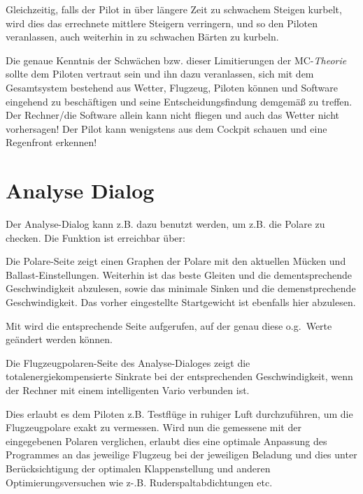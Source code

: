 Gleichzeitig,  falls der Pilot in über längere Zeit zu schwachem Steigen kurbelt,
wird dies das errechnete mittlere Steigern verringern, und so den Piloten veranlassen, auch
weiterhin in zu schwachen Bärten zu kurbeln.


\textsf{\textcolor[rgb]{0.00,0.00,0.50}
{Die genaue Kenntnis der Schwächen bzw. dieser Limitierungen
der MC-\textsl{Theorie} sollte  dem Piloten vertraut sein und ihn dazu veranlassen, sich mit dem
Gesamtsystem bestehend aus Wetter, Flugzeug, Piloten können und Software eingehend zu beschäftigen
und seine Entscheidungsfindung demgemäß zu treffen. Der Rechner/die Software allein kann nicht fliegen
und auch das Wetter nicht vorhersagen! Der Pilot kann wenigstens aus dem Cockpit schauen und eine
Regenfront erkennen!}}

\section{Analyse Dialog}

Der Analyse-Dialog kann z.B. dazu benutzt werden, um z.B. die Polare zu checken.
Die Funktion ist erreichbar über:

Die Polare-Seite zeigt einen  Graphen der Polare mit den aktuellen Mücken und Ballast-Einstellungen.
Weiterhin ist das beste Gleiten und die dementsprechende Geschwindigkeit abzulesen, sowie das
minimale Sinken und die demenstprechende Geschwindigkeit.
Das vorher eingestellte  Startgewicht ist ebenfalls hier  abzulesen.

Mit  wird die entsprechende Seite aufgerufen, auf der genau diese o.g.\ Werte geändert werden können.

Die Flugzeugpolaren-Seite  des Analyse-Dialoges zeigt die totalenergiekompensierte Sinkrate bei der
entsprechenden Geschwindigkeit, wenn der Rechner mit einem intelligenten Vario verbunden ist.

Dies erlaubt es dem Piloten z.B. Testflüge in ruhiger Luft durchzuführen, um die Flugzeugpolare exakt zu vermessen.
Wird nun die gemessene  mit der eingegebenen Polaren verglichen, erlaubt dies eine optimale Anpassung des Programmes an das jeweilige Flugzeug bei der jeweiligen Beladung und dies unter Berücksichtigung der optimalen Klappenstellung und anderen Optimierungsversuchen wie z-.B. Ruderspaltabdichtungen etc.

